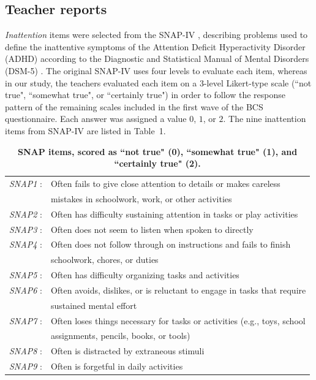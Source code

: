 \documentclass[10pt,letterpaper]{article}
\begin{document}
\vspace{3mm}
\subsection*{Teacher reports}
\emph{Inattention} items were selected from the SNAP-IV \cite{Swanson1992}, describing problems used to define the inattentive symptoms of the Attention Deficit Hyperactivity Disorder (ADHD) according to the Diagnostic and Statistical Manual of Mental Disorders (DSM-5) \cite{APA2013}. The original SNAP-IV uses four levels to evaluate each item, whereas in our study, the teachers evaluated each item on a 3-level Likert-type scale (``not true", ``somewhat true", or ``certainly true") in order to follow the response pattern of the remaining scales included in the first wave of the BCS questionnaire. Each answer was assigned a value $0$, $1$, or $2$. 
The  nine inattention items from SNAP-IV are listed in Table~1. 


\begin{table}[!ht]
\begin{adjustwidth}{-5mm}{0in} 
\centering
\caption{\bf SNAP items, scored as ``not true" (0), ``somewhat true" (1), and ``certainly true" (2).}
\vspace{5mm}
\begin{tabular}{|ll|}
\hline
{\it SNAP1} : & Often fails to give close attention to details or makes careless\\ & mistakes in schoolwork, work, or other activities\\ \hline
{\it SNAP2} : & Often has difficulty sustaining attention in tasks or play activities \\ \hline
{\it SNAP3} : & Often does not seem to listen when spoken to directly \\ \hline
{\it SNAP4} : & Often does not follow through on instructions and fails to finish\\ &  schoolwork, chores, or duties\\ \hline
{\it SNAP5} : & Often has difficulty organizing tasks and activities \\ \hline
{\it SNAP6} : & Often avoids, dislikes, or is reluctant to engage in tasks that require\\ & sustained mental effort\\ \hline
{\it SNAP7} : & Often loses things necessary for tasks or activities (e.g., toys, school\\ &  assignments, pencils, books, or tools) \\ \hline
{\it SNAP8} : & Often is distracted by extraneous stimuli\\ \hline
{\it SNAP9} : & Often is forgetful in daily activities \\ \hline
\end{tabular}
\label{Table1}
\end{adjustwidth}
\end{table}
\end{document}
